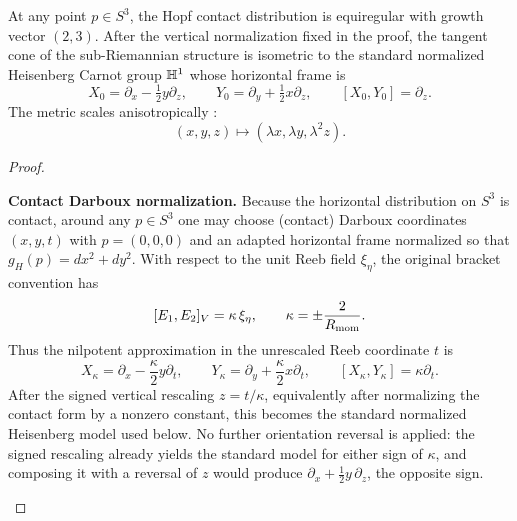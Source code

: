 \documentclass[11pt]{article}
\begin{document}
\begin{proposition}
\label{p1:prop:nilpotent-approx}
At any point \(p\in S^3\), the Hopf contact distribution is equiregular with growth vector \((2,3)\).  After the vertical normalization fixed in the proof, the tangent cone of the sub-Riemannian structure is isometric to the standard normalized Heisenberg Carnot group \(\mathbb{H}^1\) whose horizontal frame is
\[
X_0=\partial_x-\tfrac12 y\partial_z,
\qquad
Y_0=\partial_y+\tfrac12 x\partial_z,
\qquad [X_0,Y_0]=\partial_z.
\]
The metric scales anisotropically \cite{mitchell1985cc,montgomery2002tour,agrachev2019comprehensive}:
\[
(x, y, z) \mapsto (\lambda x, \lambda y, \lambda^2 z).
\]
\end{proposition}
\begin{proof}

\begin{proofsteps}
\item \textbf{Contact Darboux normalization.}
Because the horizontal distribution on $S^3$ is contact, around any $p\in S^3$ one may choose
(contact) Darboux coordinates $(x,y,t)$ with $p=(0,0,0)$ and an adapted horizontal frame normalized so that $g_H(p)=dx^2+dy^2$. With respect to the unit Reeb field $\xi_\eta$, the original bracket convention has
\[
[E_1,E_2]_V=\kappa\,\xi_\eta,\qquad \kappa=\pm\frac{2}{R_{\mathrm{mom}}}.
\]
Thus the nilpotent approximation in the unrescaled Reeb coordinate $t$ is
\[
X_\kappa=\partial_x-\frac{\kappa}{2}y\partial_t,\qquad
Y_\kappa=\partial_y+\frac{\kappa}{2}x\partial_t,\qquad [X_\kappa,Y_\kappa]=\kappa\partial_t.
\]
After the signed vertical rescaling $z=t/\kappa$, equivalently after normalizing the contact form by a nonzero constant, this becomes the standard normalized Heisenberg model used below.  No further orientation reversal is applied: the signed rescaling already yields the standard model for either sign of $\kappa$, and composing it with a reversal of $z$ would produce $\partial_x+\tfrac12 y\,\partial_z$, the opposite sign.


\end{proofsteps}
\end{proof}
\end{document}
